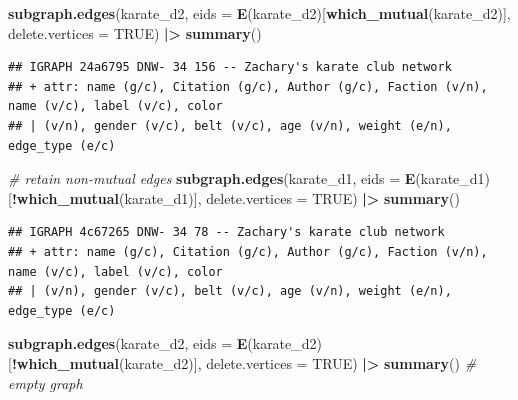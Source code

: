 \documentclass[
]{book}
\newenvironment{Shaded}{\begin{snugshade}}{\end{snugshade}}
\newcommand{\AttributeTok}[1]{\textcolor[rgb]{0.13,0.29,0.53}{#1}}
\newcommand{\CommentTok}[1]{\textcolor[rgb]{0.56,0.35,0.01}{\textit{#1}}}
\newcommand{\ConstantTok}[1]{\textcolor[rgb]{0.56,0.35,0.01}{#1}}
\newcommand{\FunctionTok}[1]{\textcolor[rgb]{0.13,0.29,0.53}{\textbf{#1}}}
\newcommand{\NormalTok}[1]{#1}
\newcommand{\SpecialCharTok}[1]{\textcolor[rgb]{0.81,0.36,0.00}{\textbf{#1}}}
\begin{document}
\begin{Shaded}
\begin{Highlighting}[]
\FunctionTok{subgraph.edges}\NormalTok{(karate\_d2, }\AttributeTok{eids =} \FunctionTok{E}\NormalTok{(karate\_d2)[}\FunctionTok{which\_mutual}\NormalTok{(karate\_d2)], }\AttributeTok{delete.vertices =} \ConstantTok{TRUE}\NormalTok{) }\SpecialCharTok{|\textgreater{}} 
  \FunctionTok{summary}\NormalTok{()}
\end{Highlighting}
\end{Shaded}

\begin{verbatim}
## IGRAPH 24a6795 DNW- 34 156 -- Zachary's karate club network
## + attr: name (g/c), Citation (g/c), Author (g/c), Faction (v/n), name (v/c), label (v/c), color
## | (v/n), gender (v/c), belt (v/c), age (v/n), weight (e/n), edge_type (e/c)
\end{verbatim}

\begin{Shaded}
\begin{Highlighting}[]
\CommentTok{\# retain non{-}mutual edges }
\FunctionTok{subgraph.edges}\NormalTok{(karate\_d1, }\AttributeTok{eids =} \FunctionTok{E}\NormalTok{(karate\_d1)[}\SpecialCharTok{!}\FunctionTok{which\_mutual}\NormalTok{(karate\_d1)], }\AttributeTok{delete.vertices =} \ConstantTok{TRUE}\NormalTok{) }\SpecialCharTok{|\textgreater{}} 
  \FunctionTok{summary}\NormalTok{()}
\end{Highlighting}
\end{Shaded}

\begin{verbatim}
## IGRAPH 4c67265 DNW- 34 78 -- Zachary's karate club network
## + attr: name (g/c), Citation (g/c), Author (g/c), Faction (v/n), name (v/c), label (v/c), color
## | (v/n), gender (v/c), belt (v/c), age (v/n), weight (e/n), edge_type (e/c)
\end{verbatim}

\begin{Shaded}
\begin{Highlighting}[]
\FunctionTok{subgraph.edges}\NormalTok{(karate\_d2, }\AttributeTok{eids =} \FunctionTok{E}\NormalTok{(karate\_d2)[}\SpecialCharTok{!}\FunctionTok{which\_mutual}\NormalTok{(karate\_d2)], }\AttributeTok{delete.vertices =} \ConstantTok{TRUE}\NormalTok{) }\SpecialCharTok{|\textgreater{}} 
  \FunctionTok{summary}\NormalTok{() }\CommentTok{\# empty graph}
\end{Highlighting}
\end{Shaded}
\end{document}
